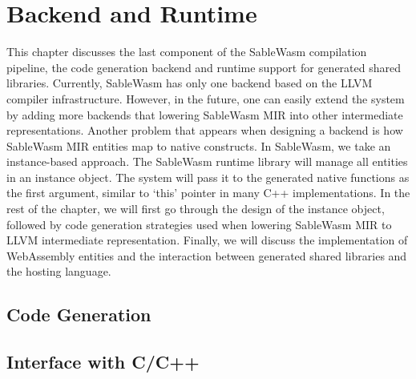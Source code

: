 \chapter{Backend and Runtime}

This chapter discusses the last component of the SableWasm compilation pipeline, the code generation backend and runtime support for generated shared libraries. Currently, SableWasm has only one backend based on the LLVM compiler infrastructure. However, in the future, one can easily extend the system by adding more backends that lowering SableWasm MIR into other intermediate representations. Another problem that appears when designing a backend is how SableWasm MIR entities map to native constructs. In SableWasm, we take an instance-based approach. The SableWasm runtime library will manage all entities in an instance object. The system will pass it to the generated native functions as the first argument, similar to `this' pointer in many C++ implementations. In the rest of the chapter, we will first go through the design of the instance object, followed by code generation strategies used when lowering SableWasm MIR to LLVM intermediate representation. Finally, we will discuss the implementation of WebAssembly entities and the interaction between generated shared libraries and the hosting language.




\section{Code Generation}

\section{Interface with C/C++}
